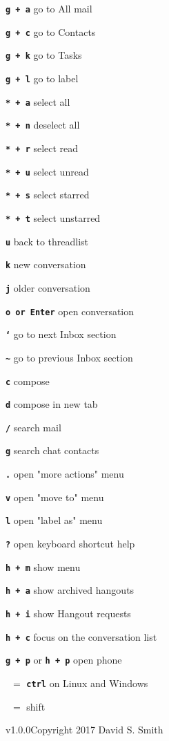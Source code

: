 \documentclass[11pt,letterpaper]{article}
\newcommand{\sck}[1]{\textbf{\texttt{#1}}}
\newcommand{\hdr}[1]{\vspace{1em}{\sffamily\bf \large #1}\vspace{0.5em}}
\begin{document}
\sck{g + a} \dotfill go to All mail	

\sck{g + c} \dotfill go to Contacts	

\sck{g + k} \dotfill go to Tasks	

\sck{g + l} \dotfill go to label	

\hdr{Threadlist Selection}

\sck{* + a} \dotfill select all	

\sck{* + n} \dotfill deselect all	

\sck{* + r} \dotfill select read	

\sck{* + u} \dotfill select unread	

\sck{* + s} \dotfill select starred	

\sck{* + t} \dotfill select unstarred	

\hdr{Navigation}

\sck{u} \dotfill back to threadlist	

\sck{k} \dotfill new conversation	

\sck{j} \dotfill older conversation	

\sck{o or Enter} \dotfill open conversation	

\sck{`} \dotfill go to next Inbox section	

\sck{\textasciitilde} \dotfill go to previous Inbox section	

\hdr{Application}

\sck{c} \dotfill compose	

\sck{d} \dotfill compose in new tab	

\sck{/} \dotfill search mail	

\sck{g} \dotfill search chat contacts	

\sck{.} \dotfill open "more actions" menu	

\sck{v} \dotfill open "move to" menu	

\sck{l} \dotfill open "label as" menu	

\sck{?} \dotfill open keyboard shortcut help	

\hdr{Hangouts}

\sck{h + m} \dotfill  show menu	

\sck{h + a} \dotfill  show archived hangouts	

\sck{h + i} \dotfill  show Hangout requests	

\sck{h + c} \dotfill focus on the conversation list	

\sck{g + p} or \sck{h + p} \dotfill open phone	

\vfill



\cmd\ $=$ \sck{ctrl} on Linux and Windows

\shift\ $=$ shift \vspace{2em}


{v1.0.0\break Copyright 2017 David S. Smith}
\end{document}
